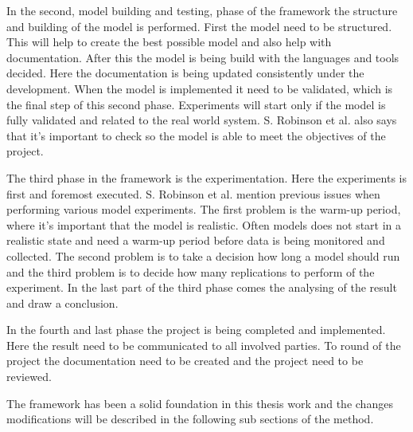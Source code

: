 In the second, model building and testing, phase of the framework the structure and building of the model is performed.
First the model need to be structured. 
This will help to create the best possible model and also help with documentation.
After this the model is being build with the languages and tools decided.
Here the documentation is being updated consistently under the development.
When the model is implemented it need to be validated, which is the final step of this second phase.
Experiments will start only if the model is fully validated and related to the real world system.
S. Robinson et al. also says that it's important to check so the model is able to meet the objectives of the project.

\bigskip

The third phase in the framework is the experimentation.
Here the experiments is first and foremost executed.
S. Robinson et al. mention previous issues when performing various model experiments.
The first problem is the warm-up period, where it's important that the model is realistic.
Often models does not start in a realistic state and need a warm-up period before data is being monitored and collected.
The second problem is to take a decision how long a model should run and the third problem is to decide how many replications to perform of the experiment.
In the last part of the third phase comes the analysing of the result and draw a conclusion.

\bigskip

In the fourth and last phase the project is being completed and implemented.
Here the result need to be communicated to all involved parties.
To round of the project the documentation need to be created and the project need to be reviewed.

\bigskip

The framework has been a solid foundation in this thesis work and the changes modifications will be described in the following sub sections of the method.





